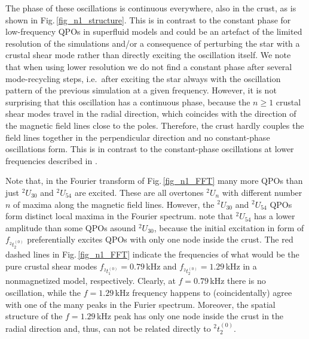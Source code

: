 \documentclass[useAMS,usenatbib]{mnras}
\begin{document}
The phase of these oscillations is continuous everywhere, also in the crust, as 
is shown in Fig.\,\ref{fig_n1_structure}. 
This is in contrast to the constant phase for low-frequency QPOs in 
superfluid models and could be 
an artefact of the limited resolution of the simulations and/or a consequence of 
perturbing the star with a crustal shear mode rather than directly exciting the 
oscillation itself. We note that when using lower resolution we do not find a 
constant phase after several mode-recycling steps, i.e.~after exciting the star 
always with the  oscillation pattern of the previous simulation at a given 
frequency. However, it is not surprising that this oscillation has a continuous 
phase, because the $n\geq1$ crustal shear modes travel in the radial direction, 
which coincides with the direction of the magnetic field lines close to the 
poles. Therefore, the crust hardly couples the field lines together in the 
perpendicular direction and no constant-phase oscillations form. This is in 
contrast to the constant-phase oscillations at lower frequencies described in 
\cite{Gabler2013a,Gabler2016}. 


Note that, in the Fourier transform of Fig.\,\ref{fig_n1_FFT} many 
more QPOs than just $^2U_{30}$ and $^2U_{54}$ are excited. These are 
all overtones $^2U_n$ with different number $n$ of maxima along the magnetic 
field lines. However, the $^2U_{30}$ and $^2U_{54}$ QPOs form distinct 
local maxima in the Fourier spectrum. note that $^2U_{54}$ has a lower 
amplitude than some QPOs asound $^2U_{30}$, because the initial excitation 
in form of $f_{^2t^{(0)}_2}$ preferentially excites QPOs with only one node 
inside the crust. The 
red dashed lines in Fig.\,\ref{fig_n1_FFT} indicate the frequencies of 
what would be the pure crustal shear modes $f_{^2t^{(0)}_1}=0.79\,$kHz 
and $f_{^2t^{(0)}_2}=1.29\,$kHz in a nonmagnetized model, 
respectively. Clearly, at $f=0.79\,$kHz there is no oscillation, while the 
$f=1.29\,$kHz frequency happens to (coincidentally) agree with one of 
the many peaks in the Furier spectrum.  Moreover, the spatial structure of the 
$f=1.29\,$kHz peak has only one node inside the crust in the radial direction 
and, thus, can not be related directly to ${^2t^{(0)}_2}$.
\end{document}
